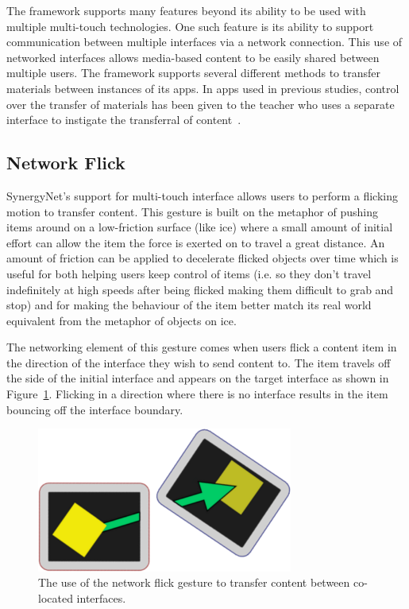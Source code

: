 \documentclass[a4paper,11pt]{article}
\begin{document}
The framework supports many features beyond its ability to be used with multiple multi-touch technologies.
One such feature is its ability to support communication between multiple interfaces via a network connection.
This use of networked interfaces allows media-based content to be easily shared between multiple users.
The framework supports several different methods to transfer materials between instances of its apps.
In apps used in previous studies, control over the transfer of materials has been given to the teacher who uses a separate interface to instigate the transferral of content~\cite{alagha-et-al:2010,mercier:2016}.


\subsection{Network Flick}

SynergyNet's support for multi-touch interface allows users to perform a flicking~\cite{reetz-et-al:2006} motion to transfer content.
This gesture is built on the metaphor of pushing items around on a low-friction surface (like ice) where a small amount of initial effort can allow the item the force is exerted on to travel a great distance.
An amount of friction can be applied to decelerate flicked objects over time which is useful for both helping users keep control of items (i.e.
so they don't travel indefinitely at high speeds after being flicked making them difficult to grab and stop) and for making the behaviour of the item better match its real world equivalent from the metaphor of objects on ice.

The networking element of this gesture comes when users flick a content item in the direction of the interface they wish to send content to.
The item travels off the side of the initial interface and appears on the target interface as shown in Figure~\ref{fig:FlickExample}.
Flicking in a direction where there is no interface results in the item bouncing off the interface boundary.

\begin{figure}[h]
 \centering
   \includegraphics[width=0.75\textwidth]{figures/flickexample.png}
   \caption{The use of the network flick gesture to transfer content between co-located interfaces.}
   \label{fig:FlickExample}
\end{figure}
\end{document}
